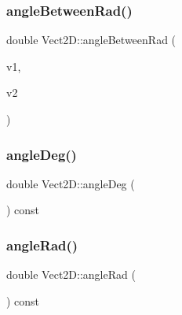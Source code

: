 \mbox{\label{classVect2D_a3f8039dc87affb32f851b1937a1fa2fd_a3f8039dc87affb32f851b1937a1fa2fd}} 
\subsubsection{\texorpdfstring{angle\+Between\+Rad()}{angleBetweenRad()}\hspace{0.1cm}{\footnotesize\ttfamily [2/2]}}
{\footnotesize\ttfamily double Vect2\+D\+::angle\+Between\+Rad (\begin{DoxyParamCaption}\item[{const \hyperlink{classVect2D}{Vect2D} \&}]{v1,  }\item[{const \hyperlink{classVect2D}{Vect2D} \&}]{v2 }\end{DoxyParamCaption})\hspace{0.3cm}{\ttfamily [static]}}

\mbox{\label{classVect2D_a13ca3566f8ff594598bba9e08fcbc88c_a13ca3566f8ff594598bba9e08fcbc88c}} 
\subsubsection{\texorpdfstring{angle\+Deg()}{angleDeg()}}
{\footnotesize\ttfamily double Vect2\+D\+::angle\+Deg (\begin{DoxyParamCaption}{ }\end{DoxyParamCaption}) const}

\mbox{\label{classVect2D_ab1be9b2af5abce11bc0cbb73a76aeaa5_ab1be9b2af5abce11bc0cbb73a76aeaa5}} 
\subsubsection{\texorpdfstring{angle\+Rad()}{angleRad()}}
{\footnotesize\ttfamily double Vect2\+D\+::angle\+Rad (\begin{DoxyParamCaption}{ }\end{DoxyParamCaption}) const}

